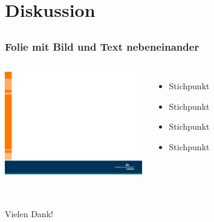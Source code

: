 \section{Diskussion}
\subsection*{}
\begin{frame}
\frametitle{Folie mit Bild und Text nebeneinander}
\begin{columns}
    \column{6cm}
    \vskip5mm
 	    \includegraphics[width=6.0cm]{style/images/master_background}
    \vskip5mm
    \column{5cm}
    \vspace{0cm}
	\begin{itemize}
   		 \item Stichpunkt\newline
      	 \item Stichpunkt\newline
       	 \item Stichpunkt\newline
     	 \item Stichpunkt\newline
       	\end{itemize}
 \end{columns}
\end{frame}

\begin{frame}
\frametitle{}
\vskip5mm
\begin{columns}
    \column{12cm}
 	\centering
	\huge{Vielen Dank!}
 \end{columns}
\end{frame}



